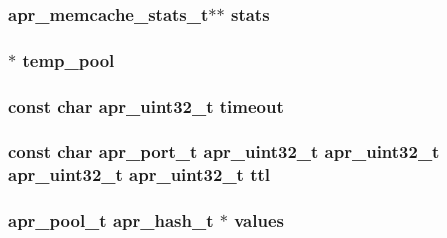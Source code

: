 \subsubsection[{\texorpdfstring{stats}{stats}}]{ {\bf apr\+\_\+memcache\+\_\+stats\+\_\+t}$\ast$$\ast$ stats}\hypertarget{group__APR__Util__MC_gaff19ebd812fbce997074d41b1073c76e}{}\label{group__APR__Util__MC_gaff19ebd812fbce997074d41b1073c76e}
\subsubsection[{\texorpdfstring{temp\+\_\+pool}{temp_pool}}]{$\ast$ temp\+\_\+pool}\hypertarget{group__APR__Util__MC_gabc902b08134dbf7de7c4ea169a265f56}{}\label{group__APR__Util__MC_gabc902b08134dbf7de7c4ea169a265f56}
\subsubsection[{\texorpdfstring{timeout}{timeout}}]{\setlength{\rightskip}{0pt plus 5cm}const char {\bf apr\+\_\+uint32\+\_\+t} timeout}\hypertarget{group__APR__Util__MC_ga48b7aa88e5841c0fe69f7d9a88646af3}{}\label{group__APR__Util__MC_ga48b7aa88e5841c0fe69f7d9a88646af3}
\subsubsection[{\texorpdfstring{ttl}{ttl}}]{\setlength{\rightskip}{0pt plus 5cm}const char {\bf apr\+\_\+port\+\_\+t} {\bf apr\+\_\+uint32\+\_\+t} {\bf apr\+\_\+uint32\+\_\+t} {\bf apr\+\_\+uint32\+\_\+t} {\bf apr\+\_\+uint32\+\_\+t} ttl}\hypertarget{group__APR__Util__MC_ga6e9eb567b7ddf19610db54e8c46cf78b}{}\label{group__APR__Util__MC_ga6e9eb567b7ddf19610db54e8c46cf78b}
\subsubsection[{\texorpdfstring{values}{values}}]{ {\bf apr\+\_\+pool\+\_\+t} {\bf apr\+\_\+hash\+\_\+t} $\ast$ values}\hypertarget{group__APR__Util__MC_ga5aee14eb2e1149ea060d4fdccb50997d}{}\label{group__APR__Util__MC_ga5aee14eb2e1149ea060d4fdccb50997d}
